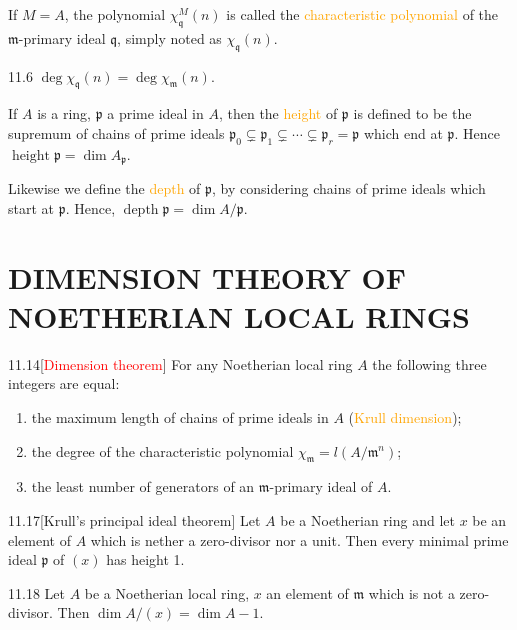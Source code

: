 If $M=A$, the polynomial $\chi_\mathfrak{q}^M(n)$ is called the \textcolor{orange}{characteristic polynomial} of the $\mathfrak{m}$-primary ideal $\mathfrak{q}$, simply noted as $\chi_\mathfrak{q}(n)$.

\begin{proposition}{11.6}
	$\operatorname{deg}\chi_\mathfrak{q}(n)=\operatorname{deg}\chi_\mathfrak{m}(n)$.
\end{proposition}

If $A$ is a ring, $\mathfrak{p}$ a prime ideal in $A$, then the \textcolor{orange}{height} of $\mathfrak{p}$ is defined to be the supremum of chains of prime ideals $\mathfrak{p}_0\subsetneq\mathfrak{p}_1\subsetneq\cdots\subsetneq\mathfrak{p}_r=\mathfrak{p}$ which end at $\mathfrak{p}$. Hence $\operatorname{height}\mathfrak{p}=\dim A_\mathfrak{p}$.

Likewise we define the \textcolor{orange}{depth} of $\mathfrak{p}$, by considering chains of prime ideals which start at $\mathfrak{p}$. Hence, $\operatorname{depth}\mathfrak{p}=\dim A/\mathfrak{p}$.

\section*{DIMENSION THEORY OF NOETHERIAN LOCAL RINGS}

\begin{theorem}{11.14}[\textcolor{red}{Dimension theorem}]
	For any Noetherian local ring $A$ the following three integers are equal:
	\begin{enumerate}[label=\textup{(\roman*)}]
		\item the maximum length of chains of prime ideals in $A$ (\textcolor{orange}{Krull dimension});
		\item the degree of the characteristic polynomial $\chi_\mathfrak{m}=l\left(A/\mathfrak{m}^n\right)$;
		\item the least number of generators of an $\mathfrak{m}$-primary ideal of $A$.
	\end{enumerate}
\end{theorem}

\begin{corollary}{11.17}[Krull's principal ideal theorem]
	Let $A$ be a Noetherian ring and let $x$ be an element of $A$ which is nether a zero-divisor nor a unit. Then every minimal prime ideal $\mathfrak{p}$ of $(x)$ has height 1.
\end{corollary}

\begin{corollary}{11.18}
	Let $A$ be a Noetherian local ring, $x$ an element of $\mathfrak{m}$ which is not a zero-divisor. Then $\dim A/(x)=\dim A-1$.
\end{corollary}

